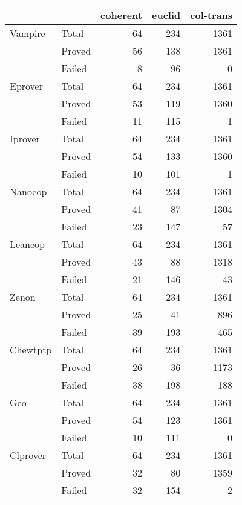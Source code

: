 \documentclass{article}
\begin{document}
\begin{tabular}{llrrr}
\toprule
 &  &  coherent & euclid & col-trans \\
\midrule
Vampire & Total &64 & 234 & 1361 \\
      & Proved & 56 & 138 & 1361 \\
      & Failed & 8 & 96 & 0 \\
Eprover & Total &64 & 234 & 1361 \\
      & Proved & 53 & 119 & 1360 \\
      & Failed & 11 & 115 & 1 \\
Iprover & Total &64 & 234 & 1361 \\
      & Proved & 54 & 133 & 1360 \\
      & Failed & 10 & 101 & 1 \\
Nanocop & Total &64 & 234 & 1361 \\
      & Proved & 41 & 87 & 1304 \\
      & Failed & 23 & 147 & 57 \\
Leancop & Total &64 & 234 & 1361 \\
      & Proved & 43 & 88 & 1318 \\
      & Failed & 21 & 146 & 43 \\
Zenon & Total &64 & 234 & 1361 \\
      & Proved & 25 & 41 & 896 \\
      & Failed & 39 & 193 & 465 \\
Chewtptp & Total &64 & 234 & 1361 \\
      & Proved & 26 & 36 & 1173 \\
      & Failed & 38 & 198 & 188 \\
Geo & Total &64 & 234 & 1361 \\
      & Proved & 54 & 123 & 1361 \\
      & Failed & 10 & 111 & 0 \\
Clprover & Total &64 & 234 & 1361 \\
      & Proved & 32 & 80 & 1359 \\
      & Failed & 32 & 154 & 2 \\
\bottomrule
\end{tabular}
\end{document}
